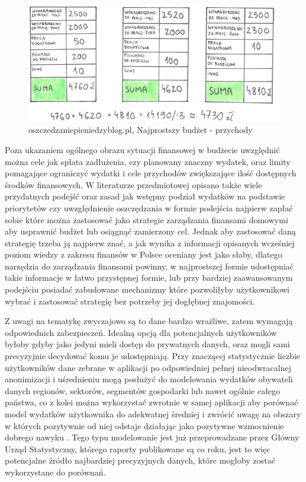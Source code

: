 \documentclass[a4paper,10pt, twoside]{report}
\begin{document}
\begin{large}
\begin{figure}[H]           %
    \centering
    \includegraphics[width=12cm]{figures/oszczedzaniepieniedzyblog-pl_przychody.jpg}
    \caption{oszczedzaniepieniedzyblog.pl, Najprostszy budżet - przychody}
    \label{fig:prostybudżetprzychody}
\end{figure}

{Poza ukazaniem ogólnego obrazu sytuacji finansowej w budżecie uwzględnić można 
cele jak spłata zadłużenia, czy planowany znaczny wydatek, oraz limity 
pomagające ograniczyć wydatki i cele przychodów zwiększające ilość dostępnych 
środków finansowych. W literaturze przedmiotowej opisano także wiele przydatnych
 podejść oraz zasad jak wstępny podział wydatków na podstawie 
priorytetów \cite{najbogatszyczlowiekwbabilonie}\cite{budzetdomowypodkontrola} 
czy uwzględnienie oszczędzania w formie podejścia najpierw zapłać sobie 
\cite{najbogatszyczlowiekwbabilonie}\cite{finansowaforteca} które można 
zastosować jako strategie zarządzania finansami domowymi aby usprawnić budżet 
lub osiągnąć zamierzony cel. Jednak aby zastosować daną strategię trzeba ją 
najpierw znać, a jak wynika z informacji opisanych wcześniej poziom wiedzy z 
zakresu finansów w Polsce oceniany jest jako słaby, dlatego narzędzia do 
zarządzania finansami powinny, w najprostszej formie udostępniać takie 
informacje w łatwo przystępnej formie, lub przy bardziej zaawansowanym podejściu
 posiadać zabudowane mechanizmy które pozwoliłyby użytkownikowi wybrać i 
zastosować strategię bez potrzeby jej dogłębnej znajomości.}

{Z uwagi na tematykę zwyczajowo są to dane bardzo wrażliwe, zatem wymagają 
odpowiednich zabezpieczeń. Idealną opcją dla potencjalnych użytkowników byłoby 
gdyby jako jedyni mieli dostęp do prywatnych danych, oraz mogli sami precyzyjnie
 decydować komu je udostępniają. Przy znaczącej statystycznie liczbie 
użytkowników dane zebrane w aplikacji po odpowiedniej pełnej nieodwracalnej 
anonimizacji i uśrednieniu mogą posłużyć do modelowania wydatków obywateli 
danych regionów, sektorów, segmentów gospodarki lub nawet ogólnie całego 
państwa, co z kolei można wykorzystać zwrotnie w samej aplikacji aby porównać 
model wydatków użytkownika do adekwatnej średniej i zwrócić uwagę na obszary w 
których pozytywnie od niej odstaje działając jako pozytywne wzmocnienie 
dobrego nawyku \cite{pozytywnewzmocnienie}. Tego typu modelowanie jest już 
przeprowadzane przez Główny Urząd Statystyczny, którego raporty publikowane są 
co roku, jest to więc potencjalne źródło najbardziej precyzyjnych danych, które 
mogłoby zostać wykorzystane do porównań.}



\end{large}
\end{document}
